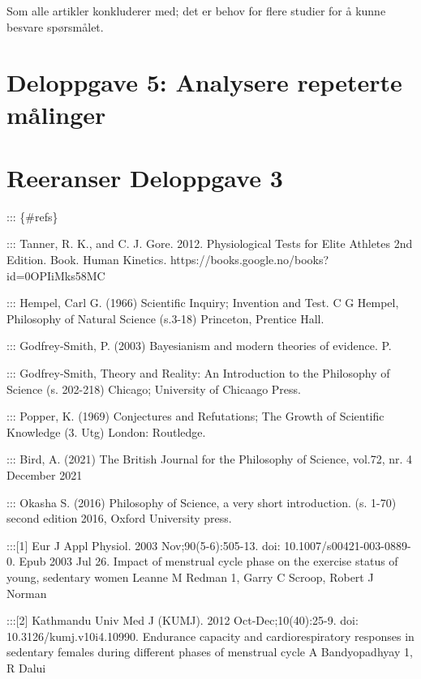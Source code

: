 \documentclass[
  letterpaper,
  DIV=11,
  numbers=noendperiod]{scrreprt}
\begin{document}
Som alle artikler konkluderer med; det er behov for flere studier for å
kunne besvare spørsmålet.


\hypertarget{deloppgave-5-analysere-repeterte-muxe5linger}{%
\chapter{Deloppgave 5: Analysere repeterte
målinger}\label{deloppgave-5-analysere-repeterte-muxe5linger}}


\hypertarget{reeranser-deloppgave-3}{%
\chapter{Reeranser Deloppgave 3}\label{reeranser-deloppgave-3}}

::: \{\#refs\}

::: Tanner, R. K., and C. J. Gore. 2012. Physiological Tests for Elite
Athletes 2nd Edition. Book. Human Kinetics.
https://books.google.no/books?id=0OPIiMks58MC

::: Hempel, Carl G. (1966) Scientific Inquiry; Invention and Test.
\textbar{} C G Hempel, Philosophy of Natural Science (s.3-18) Princeton,
Prentice Hall.

::: Godfrey-Smith, P. (2003) Bayesianism and modern theories of
evidence. \textbar{} P.

::: Godfrey-Smith, Theory and Reality: An Introduction to the Philosophy
of Science (s. 202-218) Chicago; University of Chicaago Press.

::: Popper, K. (1969) Conjectures and Refutations; The Growth of
Scientific Knowledge (3. Utg) London: Routledge.

::: Bird, A. (2021) The British Journal for the Philosophy of Science,
vol.72, nr. 4 December 2021

::: Okasha S. (2016) Philosophy of Science, a very short introduction.
(s. 1-70) second edition 2016, Oxford University press.

:::{[}1{]} Eur J Appl Physiol. 2003 Nov;90(5-6):505-13. doi:
10.1007/s00421-003-0889-0. Epub 2003 Jul 26. Impact of menstrual cycle
phase on the exercise status of young, sedentary women Leanne M Redman
1, Garry C Scroop, Robert J Norman

:::{[}2{]} Kathmandu Univ Med J (KUMJ). 2012 Oct-Dec;10(40):25-9. doi:
10.3126/kumj.v10i4.10990. Endurance capacity and cardiorespiratory
responses in sedentary females during different phases of menstrual
cycle A Bandyopadhyay 1, R Dalui
\end{document}
